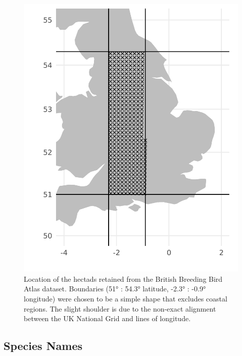 \documentclass[
]{article}
\begin{document}
\begin{figure}
\centering
\includegraphics{BirdMarkdowns/BirdImages/HectadLocations.png}
\caption{Location of the hectads retained from the British Breeding Bird
Atlas dataset. Boundaries (51° : 54.3° latitude, -2.3° : -0.9°
longitude) were chosen to be a simple shape that excludes coastal
regions. The slight shoulder is due to the non-exact alignment between
the UK National Grid and lines of longitude.}
\end{figure}

\newpage

\hypertarget{species-names-1}{%
\subsection{Species Names}\label{species-names-1}}
\end{document}
